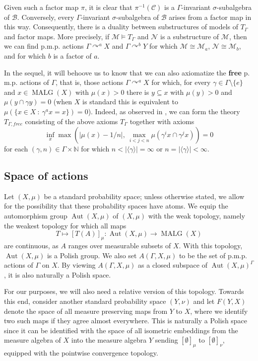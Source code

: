 \documentclass[12pt]{amsart}
\theoremstyle{definition}
\def\bb{\mathbb}
\def\bb{\mathbb}
\def\cal{\mathcal}
\DeclareMathOperator{\Aut}{Aut}
\def \Malg{\operatorname{MALG}}
\newcommand{\pmp}{p{$.$}m{$.$}p{$.$}}
\newcommand{\acts}{\curvearrowright}
\begin{document}
Given such a factor map $\pi$, it is clear that $\pi^{-1}(\cal C)$ is a $\Gamma$-invariant $\sigma$-subalgebra of $\cal B$.  Conversely, every $\Gamma$-invariant $\sigma$-subalgebra of $\cal B$ arises from a factor map in this way.  Consequently, there is a duality between substructures of models of $T_\Gamma$ and factor maps.  More precisely, if $\cal M\models T_\Gamma$ and $\cal N$ is a substructure of $\cal M$, then we can find {\pmp} actions $\Gamma\acts^a X$ and $\Gamma\acts^b Y$ for which $\cal M\cong \cal M_a$, $\cal N\cong \cal M_b$, and for which $b$ is a factor of $a$.

In the sequel, it will behoove us to know that we can also axiomatize the \textbf{free} {\pmp} actions of $\Gamma$, that is, those actions $\Gamma \acts^a X$ for which, for every $\gamma\in \Gamma\setminus\{e\}$ and $x \in \Malg(X)$ with $\mu(x) > 0$ there is $y \subseteq x$ with $\mu(y) > 0$ and $\mu(y \cap \gamma y) = 0$ (when $X$ is standard this is equivalent to $\mu(\{x\in X \ : \ \gamma^a x=x\})=0$).  Indeed, as observed in \cite[Def. 2.4]{IT}, we can form the theory $T_{\Gamma,free}$ consisting of the above axioms $T_\Gamma$ together with axioms
$$\inf_x \max(|\mu(x)-1/n|, \ \max_{i<j<n} \mu(\gamma^i x \cap \gamma^j x)) = 0$$
for each $(\gamma, n) \in \Gamma \times \bb N$ for which $n < |\langle \gamma \rangle| = \infty$ or $n = |\langle \gamma \rangle| < \infty$.

\subsection{Space of actions}\label{subsectionspace}

Let $(X,\mu)$ be a standard probability space; unless otherwise stated, we allow for the possibility that these probability spaces have atoms. We equip the automorphism group $\Aut(X,\mu)$ of $(X,\mu)$ with the weak topology, namely the weakest topology for which all maps $$T\mapsto [T(A)]_\mu:\Aut(X,\mu)\to \Malg(X)$$ are continuous, as $A$ ranges over measurable subsets of $X$.  With this topology, $\Aut(X,\mu)$ is a Polish group.  We also set $A(\Gamma ,X, \mu)$ to be the set of {\pmp} actions of $\Gamma$ on $X$.  By viewing $A(\Gamma,X,\mu)$ as a closed subspace of $\Aut(X,\mu)^\Gamma$, it is also naturally a Polish space. 

For our purposes, we will also need a relative version of this topology.  Towards this end, consider another standard probability space $(Y,\nu)$ and let $F(Y,X)$ denote the space of all measure preserving maps from $Y$ to $X$, where we identify two such maps if they agree almost everywhere. This is naturally a Polish space since it can be identified with the space of all isometric embeddings from the measure algebra of $X$ into the measure algebra $Y$ sending $[\emptyset ]_{\mu}$ to $[\emptyset ]_{\nu}$, equipped with the pointwise convergence topology.
\end{document}
